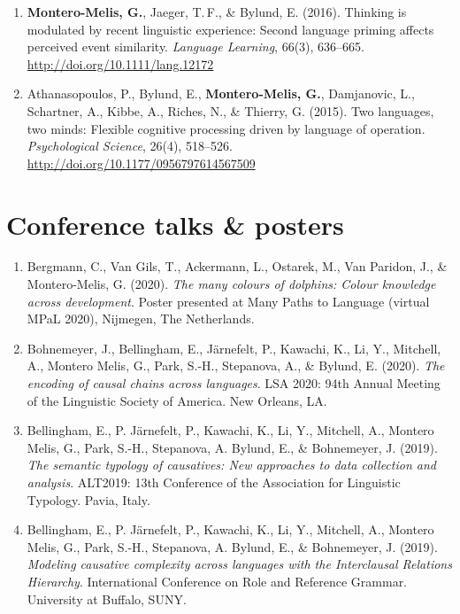 \documentclass[margin, 11pt]{res} %
\begin{document}
\begin{resume}
\begin{enumerate}
	\item \textbf{Montero-Melis, G.}, Jaeger, T.\,F., \& Bylund, E. (2016). Thinking is modulated by recent linguistic experience: Second language priming affects perceived event similarity. \emph{Language Learning}, 66(3), 636--665. \url{http://doi.org/10.1111/lang.12172}

	\item Athanasopoulos, P., Bylund, E., \textbf{Montero-Melis, G.}, Damjanovic, L., Schartner, A., Kibbe, A., Riches, N., \& Thierry, G. (2015). Two languages, two minds: Flexible cognitive processing driven by language of operation. \emph{Psychological Science}, 26(4), 518--526. \url{http://doi.org/10.1177/0956797614567509}

\end{enumerate}


\section{\sc Conference talks \& posters}
\begin{enumerate}

\item Bergmann, C., Van Gils, T., Ackermann, L., Ostarek, M., Van Paridon, J., \& Montero-Melis, G. (2020). \emph{The many colours of dolphins: Colour knowledge across development}. Poster presented at Many Paths to Language (virtual MPaL 2020), Nijmegen, The Netherlands.

\item Bohnemeyer, J., Bellingham, E., J{\"a}rnefelt, P., Kawachi, K., Li, Y., Mitchell, A., Montero Melis, G., Park, S.-H., Stepanova, A., \& Bylund, E. (2020). \emph{The encoding of causal chains across languages}. LSA 2020: 94th Annual Meeting of the Linguistic Society of America. New Orleans, LA.

\item Bellingham, E., P. J{\"a}rnefelt, P., Kawachi, K., Li, Y., Mitchell, A., Montero Melis, G., Park, S.-H., Stepanova, A. Bylund, E., \& Bohnemeyer, J. (2019). \emph{The semantic typology of causatives: New approaches to data collection and analysis}. ALT2019: 13th Conference of the Association for Linguistic Typology. Pavia, Italy. 

\item Bellingham, E., P. J{\"a}rnefelt, P., Kawachi, K., Li, Y., Mitchell, A., Montero Melis, G., Park, S.-H., Stepanova, A. Bylund, E., \& Bohnemeyer, J. (2019). \emph{Modeling causative complexity across languages with the Interclausal Relations Hierarchy}. International Conference on Role and Reference Grammar. University at Buffalo, SUNY.


\end{enumerate}
\end{resume}
\end{document}

